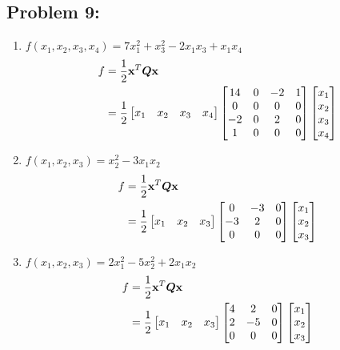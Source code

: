\documentclass{article}
\begin{document}
\subsection*{{Problem 9: }}
\label{}
\begin{enumerate}
\item 
$f(x_1, x_2,x_3, x_4) = 7x_1^2+x_3^2-2x_1x_3+x_1x_4$ \\
\begin{align*} 
f &=\frac{1}{2}\boldsymbol{\mathrm{x}}^T\boldsymbol{Q}\boldsymbol{\mathrm{x}} \\
& =\frac{1}{2} \begin{bmatrix} x_1 &  x_2 & x_3 & x_4  \end{bmatrix} \begin{bmatrix}  14 & 0 & -2 & 1 \\ 0 & 0 & 0 & 0 \\ -2 & 0 & 2 & 0 \\ 1 & 0 & 0 & 0   \end{bmatrix} \begin{bmatrix} x_1 \\  x_2 \\  x_3 \\ x_4 \end{bmatrix}
\end{align*}
\item 
$f(x_1, x_2,x_3) = x_2^2-3x_1x_2$\\
\begin{align*} 
f &=\frac{1}{2}\boldsymbol{\mathrm{x}}^T\boldsymbol{Q}\boldsymbol{\mathrm{x}} \\
& =\frac{1}{2} \begin{bmatrix} x_1 &  x_2 & x_3  \end{bmatrix} \begin{bmatrix}  0 & -3 & 0 \\ -3 & 2 & 0 \\ 0 & 0 & 0   \end{bmatrix} \begin{bmatrix} x_1 \\  x_2 \\  x_3  \end{bmatrix}
\end{align*}
\item 
$f(x_1, x_2,x_3) = 2x_1^2-5x_2^2 +2x_1x_2 $
\begin{align*} 
f &=\frac{1}{2}\boldsymbol{\mathrm{x}}^T\boldsymbol{Q}\boldsymbol{\mathrm{x}} \\
& =\frac{1}{2} \begin{bmatrix} x_1 &  x_2 & x_3  \end{bmatrix} \begin{bmatrix}  4 & 2 & 0 \\ 2 & -5 & 0 \\ 0 & 0 & 0   \end{bmatrix} \begin{bmatrix} x_1 \\  x_2 \\  x_3  \end{bmatrix}
\end{align*}
\end{enumerate}
\end{document}

